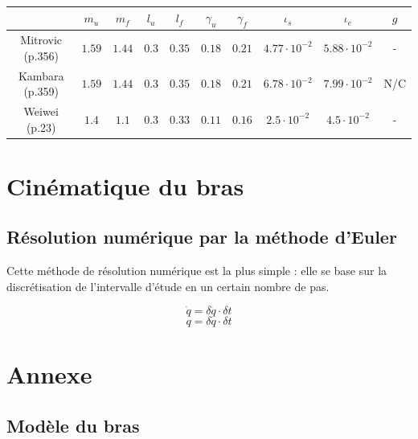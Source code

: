 \documentclass[pdftex,a4paper,11pt]{article}
\numberwithin{equation}{subsection}
\begin{document}
\paragraph{}
\begin{small}
\begin{tabular}{|c|c|c|c|c|c|c|c|c|c|}
    \hline
             & $m_u$  & $m_f$  & $l_u$ & $l_f$  & $\gamma_u$ & $\gamma_f$ & $\iota_s$            & $\iota_e$            & $g$ \\
    \hline
    Mitrovic \cite{katayama1993} (p.356) 
             & $1.59$ & $1.44$ & $0.3$ & $0.35$ & $0.18$     & $0.21$     & $4.77 \cdot 10^{-2}$ & $5.88 \cdot 10^{-2}$ & - \\
    \hline
    Kambara  \cite{kambara2009} (p.359)
             & $1.59$ & $1.44$ & $0.3$ & $0.35$ & $0.18$     & $0.21$     & $6.78 \cdot 10^{-2}$ & $7.99 \cdot 10^{-2}$ & N/C \\
    \hline
    Weiwei   \cite{li2006} (p.23)
             & $1.4$  & $1.1$  & $0.3$ & $0.33$ & $0.11$     & $0.16$     & $2.5 \cdot 10^{-2}$  & $4.5 \cdot 10^{-2}$  & - \\
    \hline
\end{tabular}
\end{small}



\section{Cinématique du bras}

\subsection{Résolution numérique par la méthode d'Euler}

Cette méthode de résolution numérique est la plus simple : elle se base sur la discrétisation de l'intervalle d'étude en un certain nombre de pas.

\[\dot{q} = \delta \ddot{q} \cdot \delta t\]
\[q = \delta \dot{q} \cdot \delta t\]


\section{Annexe}

\subsection{Modèle du bras}
\end{document}
